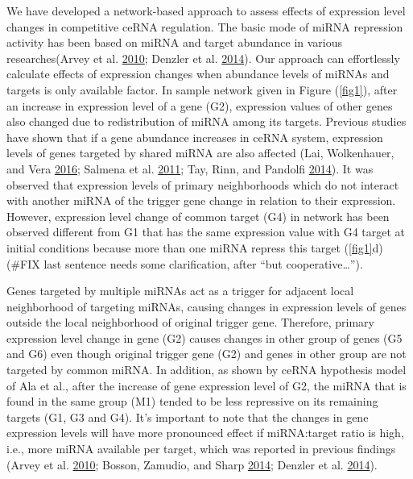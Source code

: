 \documentclass[]{article}
\begin{document}
We have developed a network-based approach to assess effects of
expression level changes in competitive ceRNA regulation. The basic mode
of miRNA repression activity has been based on miRNA and target
abundance in various researches(Arvey et al.
\protect\hyperlink{ref-arvey_target_2010}{2010}; Denzler et al.
\protect\hyperlink{ref-denzler_assessing_2014}{2014}). Our approach can
effortlessly calculate effects of expression changes when abundance
levels of miRNAs and targets is only available factor. In sample network
given in Figure (\autoref{fig1}), after an increase in expression level
of a gene (G2), expression values of other genes also changed due to
redistribution of miRNA among its targets. Previous studies have shown
that if a gene abundance increases in ceRNA system, expression levels of
genes targeted by shared miRNA are also affected (Lai, Wolkenhauer, and
Vera \protect\hyperlink{ref-lai_understanding_2016}{2016}; Salmena et
al. \protect\hyperlink{ref-salmena_cerna_2011}{2011}; Tay, Rinn, and
Pandolfi \protect\hyperlink{ref-tay_multilayered_2014}{2014}). It was
observed that expression levels of primary neighborhoods which do not
interact with another miRNA of the trigger gene change in relation to
their expression. However, expression level change of common target (G4)
in network has been observed different from G1 that has the same
expression value with G4 target at initial conditions because more than
one miRNA repress this target (\autoref{fig1}d) (\#FIX last sentence
needs some clarification, after ``but cooperative\ldots{}'').

Genes targeted by multiple miRNAs act as a trigger for adjacent local
neighborhood of targeting miRNAs, causing changes in expression levels
of genes outside the local neighborhood of original trigger gene.
Therefore, primary expression level change in gene (G2) causes changes
in other group of genes (G5 and G6) even though original trigger gene
(G2) and genes in other group are not targeted by common miRNA. In
addition, as shown by ceRNA hypothesis model of Ala et al., after the
increase of gene expression level of G2, the miRNA that is found in the
same group (M1) tended to be less repressive on its remaining targets
(G1, G3 and G4). It's important to note that the changes in gene
expression levels will have more pronounced effect if miRNA:target ratio
is high, i.e., more miRNA available per target, which was reported in
previous findings (Arvey et al.
\protect\hyperlink{ref-arvey_target_2010}{2010}; Bosson, Zamudio, and
Sharp \protect\hyperlink{ref-bosson_endogenous_2014}{2014}; Denzler et
al. \protect\hyperlink{ref-denzler_assessing_2014}{2014}). \href{}{}
\end{document}

